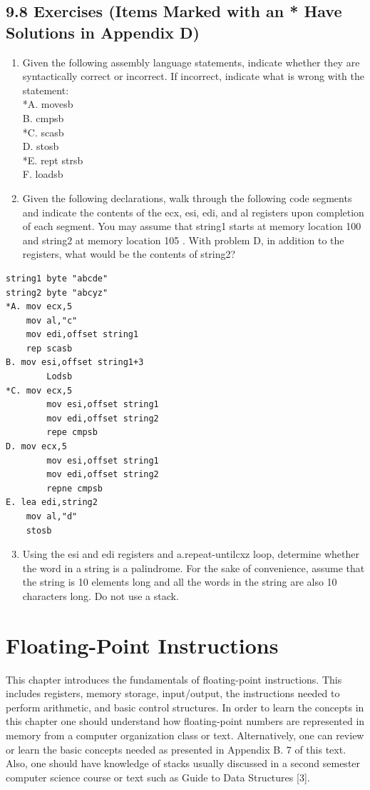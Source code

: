 \documentclass[10pt]{article}
\begin{document}
\subsection*{9.8 Exercises (Items Marked with an * Have Solutions in Appendix D)}
\begin{enumerate}
  \item Given the following assembly language statements, indicate whether they are syntactically correct or incorrect. If incorrect, indicate what is wrong with the statement:\\
*A. movesb\\
B. cmpsb\\
*C. scasb\\
D. stosb\\
*E. rept strsb\\
F. loadsb
  \item Given the following declarations, walk through the following code segments and indicate the contents of the ecx, esi, edi, and al registers upon completion of each segment. You may assume that string1 starts at memory location 100 and string2 at memory location 105 . With problem D, in addition to the registers, what would be the contents of string2?
\end{enumerate}

\begin{verbatim}
string1 byte "abcde"
string2 byte "abcyz"
*A. mov ecx,5
    mov al,"c"
    mov edi,offset string1
    rep scasb
B. mov esi,offset string1+3
        Lodsb
*C. mov ecx,5
        mov esi,offset string1
        mov edi,offset string2
        repe cmpsb
D. mov ecx,5
        mov esi,offset string1
        mov edi,offset string2
        repne cmpsb
E. lea edi,string2
    mov al,"d"
    stosb
\end{verbatim}

\begin{enumerate}
  \setcounter{enumi}{2}
  \item Using the esi and edi registers and a.repeat-untilcxz loop, determine whether the word in a string is a palindrome. For the sake of convenience, assume that the string is 10 elements long and all the words in the string are also 10 characters long. Do not use a stack.
\end{enumerate}

\section*{Floating-Point Instructions}
This chapter introduces the fundamentals of floating-point instructions. This includes registers, memory storage, input/output, the instructions needed to perform arithmetic, and basic control structures. In order to learn the concepts in this chapter one should understand how floating-point numbers are represented in memory from a computer organization class or text. Alternatively, one can review or learn the basic concepts needed as presented in Appendix B. 7 of this text. Also, one should have knowledge of stacks usually discussed in a second semester computer science course or text such as Guide to Data Structures [3].
\end{document}
